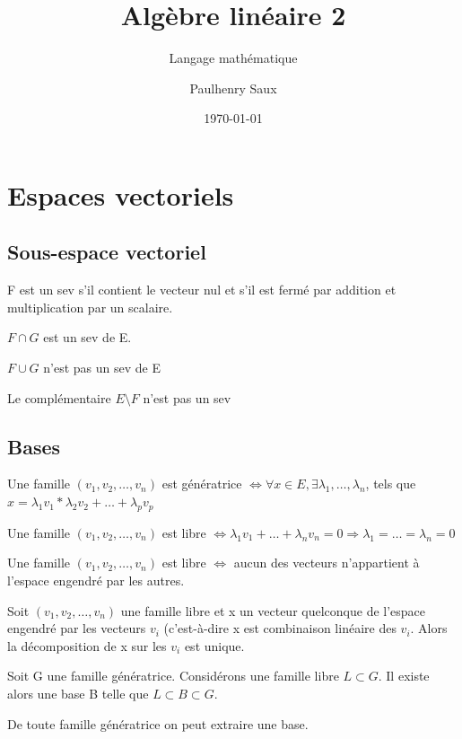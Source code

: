 \documentclass[french]{yLectureNote}
\title{Algèbre linéaire 2}
\subtitle{Langage mathématique}
\author{Paulhenry Saux}
\date{\today}
\begin{document}
\chapter{Espaces vectoriels}
\section{Sous-espace vectoriel}
\begin{proposition}
F est un sev s'il contient le vecteur nul et s'il est fermé par addition et multiplication par un scalaire.
\end{proposition}
\begin{proposition}
\(F\cap G\) est un sev de E.

\(F\cup G\) n'est pas un sev de E

Le complémentaire \(E\setminus F\) n'est pas un sev
\end{proposition}

\section{Bases}
\begin{definition}
Une famille \((v_1,v_2,\dots,v_n)\) est génératrice \(\iff \forall x\in E, \exists \lambda_1,\dots,\lambda_n\), tels que \(x = \lambda_1 v_1*\lambda_2v_2+\dots+\lambda_p v_p\)
\end{definition}
\begin{definition}
Une famille \((v_1,v_2,\dots,v_n)\) est libre \(\iff \lambda_1 v_1+\dots+\lambda_n v_n = 0 \Rightarrow \lambda_1=\dots=\lambda_n =0\)
\end{definition}
\begin{proposition}
Une famille \((v_1,v_2,\dots,v_n)\) est libre \(\iff\) aucun des vecteurs n'appartient à l'espace engendré par les autres.
\end{proposition}
\begin{theorem}
 Soit \((v_1,v_2,\dots,v_n)\) une famille libre et x un vecteur quelconque
de l’espace engendré par les vecteurs \(v_i\) (c’est-à-dire x est combinaison linéaire des
\(v_i\). Alors la décomposition de x sur les \(v_i\) est unique.
\end{theorem}
\begin{theorem}
Soit G une famille génératrice. Considérons une famille libre \(L\subset G\). Il existe alors une base B telle que \(L\subset B\subset G\).

De toute famille génératrice on peut extraire une base.
\end{theorem}
\end{document}
